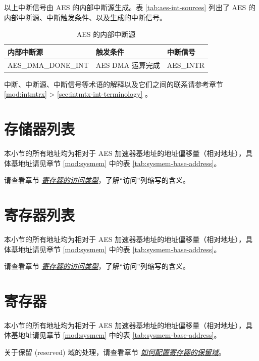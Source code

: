 \documentclass[main\_\_CN.tex]{subfiles}
\begin{document}
以上中断信号由 AES 的内部中断源生成。表 \ref{tab:aes-int-sources} 列出了 AES 的内部中断源、中断触发条件、以及生成的中断信号。

\begin{longtable}{ | L{5cm} | L{6.5cm} | L{4cm} | }
\caption{AES 的内部中断源} \label{tab:aes-int-sources}
\\ \hline
{}
\textbf{内部中断源} & \textbf{触发条件}  &  \textbf{中断信号}\\ \hline
\label{int:AESDMADONEINT}AES\_DMA\_DONE\_INT  &  AES DMA 运算完成 &  AES\_INTR  \\ \hline
\end{longtable}

\begin{tiplisting}
中断、中断源、中断信号等术语的解释以及它们之间的联系请参考章节 \ref{mod:intmtrx} \textit{} > \ref{sec:intmtx-int-terminology} \textit{}。
\end{tiplisting}


\section{存储器列表}

本小节的所有地址均为相对于 AES 加速器基地址的地址偏移量（相对地址），具体基地址请见章节 \ref{mod:sysmem} \textit{} 中的表 \ref{tab:sysmem-base-address}。

请查看章节 \hyperref[glossary-access-types]{\textit{寄存器的访问类型}}，了解“访问”列缩写的含义。



\clearpage

\hypertarget{aes-reg-summ}{}
\section{寄存器列表}

本小节的所有地址均为相对于 AES 加速器基地址的地址偏移量（相对地址），具体基地址请见章节 \ref{mod:sysmem} \textit{} 中的表 \ref{tab:sysmem-base-address}。

请查看章节 \hyperref[glossary-access-types]{\textit{寄存器的访问类型}}，了解“访问”列缩写的含义。




\clearpage
\section{寄存器}

本小节的所有地址均为相对于 AES 加速器基地址的地址偏移量（相对地址），具体基地址请见章节 \ref{mod:sysmem} \textit{} 中的表 \ref{tab:sysmem-base-address}。

关于保留 (reserved) 域的处理，请查看章节 \hyperref[programming-reserved-field]{\textit{如何配置寄存器的保留域}}。


\end{document}
